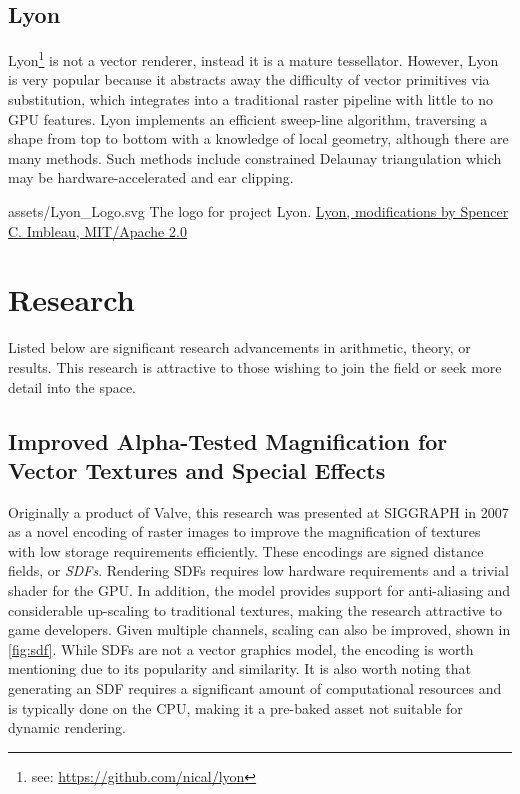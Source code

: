 \subsection{Lyon}\label{sec:lyon_lit}
Lyon\footnote{see: \href{https://github.com/nical/lyon}{https://github.com/nical/lyon}} is not a vector renderer, instead it is a mature tessellator. However, Lyon is very popular because it abstracts away the difficulty of vector primitives via substitution, which integrates into a traditional raster pipeline with little to no GPU features\cite{Lyon}. Lyon implements an efficient sweep-line algorithm, traversing a shape from top to bottom with a knowledge of local geometry\cite{Lyon_Sweep}, although there are many methods. Such methods include constrained Delaunay triangulation\cite{Chew87} which may be hardware-accelerated\cite{Qi12} and ear clipping\cite{Eberly02}.\medskip

\smallsvg
{assets/Lyon_Logo.svg}
{The logo for project Lyon.}
{\href{https://github.com/nical/lyon}{Lyon, modifications by Spencer C. Imbleau, MIT/Apache 2.0}}
\medskip

\section{Research}
Listed below are significant research advancements in arithmetic, theory, or results. This research is attractive to those wishing to join the field or seek more detail into the space.

\subsection{Improved Alpha-Tested Magnification for Vector Textures and Special Effects}
Originally a product of Valve, this research was presented at SIGGRAPH in 2007 as a novel encoding of raster images to improve the magnification of textures with low storage requirements efficiently\cite{Green07}. These encodings are signed distance fields, or \emph{SDFs}. Rendering SDFs requires low hardware requirements and a trivial shader for the GPU. In addition, the model provides support for anti-aliasing and considerable up-scaling to traditional textures, making the research attractive to game developers. Given multiple channels, scaling can also be improved\cite{Chlumsky17}, shown in \cref{fig:sdf}. While SDFs are not a vector graphics model, the encoding is worth mentioning due to its popularity and similarity. It is also worth noting that generating an SDF requires a significant amount of computational resources and is typically done on the CPU, making it a pre-baked asset not suitable for dynamic rendering.\medskip

